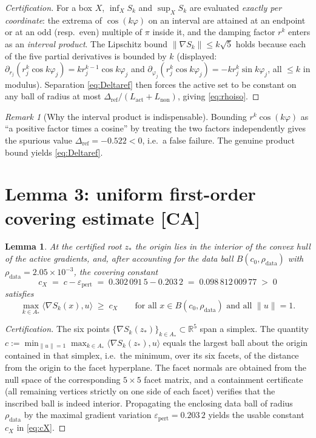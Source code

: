 \documentclass[11pt]{article}
\newtheorem{lemma}[theorem]{Lemma}
\theoremstyle{remark}
\newtheorem{remark}[theorem]{Remark}
\newcommand{\CA}{\textsf{[CA]}}
\newcommand{\R}{\mathbb{R}}
\begin{document}
\begin{proof}[Certification]
For a box $X$, $\inf_X S_k$ and $\sup_X S_k$ are evaluated \emph{exactly per coordinate}: the extrema of
$\cos(k\varphi)$ on an interval are attained at an endpoint or at an odd (resp.\ even) multiple of $\pi$
inside it, and the damping factor $r^k$ enters as an \emph{interval product}. The Lipschitz bound
$\|\nabla S_k\|\le k\sqrt5$ holds because each of the five partial derivatives is bounded by $k$
(displayed: $\partial_{r_j}(r_j^k\cos k\varphi_j)=kr_j^{k-1}\cos k\varphi_j$ and
$\partial_{\varphi_j}(r_j^k\cos k\varphi_j)=-kr_j^k\sin k\varphi_j$, all $\le k$ in modulus). Separation
\eqref{eq:Deltaref} then forces the active set to be constant on any ball of radius at most
$\Delta_{\mathrm{ref}}/(L_{\mathrm{act}}+L_{\mathrm{non}})$, giving \eqref{eq:rhoiso}.
\end{proof}

\begin{remark}[Why the interval product is indispensable]
Bounding $r^k\cos(k\varphi)$ as ``a positive factor times a cosine'' by treating the two factors
independently gives the spurious value $\Delta_{\mathrm{ref}}=-0.522<0$, i.e.\ a false failure. The
genuine product bound yields \eqref{eq:Deltaref}.
\end{remark}

\section{Lemma 3: uniform first-order covering estimate \CA}\label{lem:cover}

\begin{lemma}\label{lem:cover2}
At the certified root $z_*$ the origin lies in the interior of the convex hull of the active gradients,
and, after accounting for the data ball $B(c_0,\rho_{\mathrm{data}})$ with $\rho_{\mathrm{data}}=2.05\times10^{-3}$,
the covering constant
\begin{equation}\label{eq:cX}
c_X \;=\; c-\varepsilon_{\mathrm{pert}}
\;=\;0.302\,091\,5-0.203\,2\;=\;0.098\,812\,009\,77\;>\;0
\end{equation}
satisfies
\[
\max_{k\in A_*}\langle\nabla S_k(x),u\rangle\;\ge\;c_X\qquad\text{for all }x\in B(c_0,\rho_{\mathrm{data}})
\text{ and all }\|u\|=1 .
\]
\end{lemma}

\begin{proof}[Certification]
The six points $\{\nabla S_k(z_*)\}_{k\in A_*}\subset\R^5$ span a simplex. The quantity
$c:=\min_{\|u\|=1}\max_{k\in A_*}\langle\nabla S_k(z_*),u\rangle$ equals the largest ball about the origin
contained in that simplex, i.e.\ the minimum, over its six facets, of the distance from the origin to the
facet hyperplane. The facet normals are obtained from the null space of the corresponding $5\times5$ facet
matrix, and a containment certificate (all remaining vertices strictly on one side of each facet) verifies
that the inscribed ball is indeed interior. Propagating the enclosing data ball of radius
$\rho_{\mathrm{data}}$ by the maximal gradient variation $\varepsilon_{\mathrm{pert}}=0.203\,2$ yields the
usable constant $c_X$ in \eqref{eq:cX}.
\end{proof}
\end{document}
